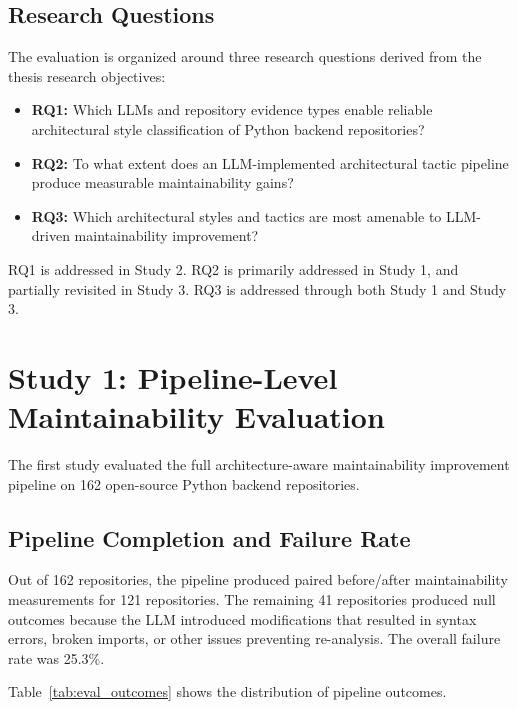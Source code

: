 \subsection{Research Questions}
\label{sec:eval_rq}

The evaluation is organized around three research questions derived from the thesis research objectives:

\begin{itemize}
    \item \textbf{RQ1:} Which LLMs and repository evidence types enable reliable architectural style classification of Python backend repositories?
    \item \textbf{RQ2:} To what extent does an LLM-implemented architectural tactic pipeline produce measurable maintainability gains?
    \item \textbf{RQ3:} Which architectural styles and tactics are most amenable to LLM-driven maintainability improvement?
\end{itemize}

RQ1 is addressed in Study 2. RQ2 is primarily addressed in Study 1, and partially revisited in Study 3. RQ3 is addressed through both Study 1 and Study 3.

\section{Study 1: Pipeline-Level Maintainability Evaluation}
\label{sec:eval_pipeline}

The first study evaluated the full architecture-aware maintainability improvement pipeline on 162 open-source Python backend repositories.

\subsection{Pipeline Completion and Failure Rate}
\label{subsec:eval_pipeline_completion}

Out of 162 repositories, the pipeline produced paired before/after maintainability measurements for 121 repositories. The remaining 41 repositories produced null outcomes because the LLM introduced modifications that resulted in syntax errors, broken imports, or other issues preventing re-analysis. The overall failure rate was 25.3\%.

Table~\ref{tab:eval_outcomes} shows the distribution of pipeline outcomes.

